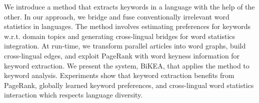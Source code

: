 We introduce a method that extracts keywords in a language with the help of the other. In our approach, we bridge and fuse conventionally irrelevant word statistics in languages. The method involves estimating preferences for keywords w.r.t. domain topics and generating cross-lingual bridges for word statistics integration. At run-time, we transform parallel articles into word graphs, build cross-lingual edges, and exploit PageRank with word keyness information for keyword extraction. We present the system, BiKEA, that applies the method to keyword analysis. Experiments show that keyword extraction benefits from PageRank, globally learned keyword preferences, and cross-lingual word statistics interaction which respects language diversity.
